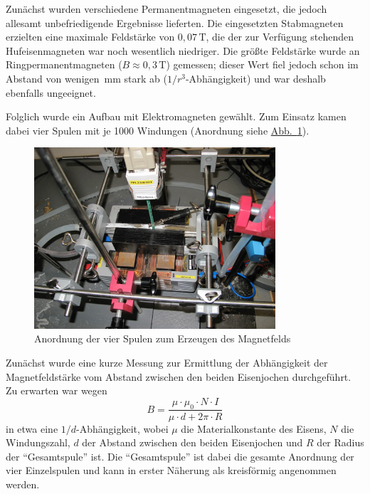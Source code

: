 \documentclass[11pt]{scrartcl}
\newcommand{\unit}[1]{\ensuremath{\,\mathrm{#1}}} %
\newcommand{\abb}[1]{\hyperref[#1]{Abb.~\ref{#1}}}
\begin{document}
Zunächst wurden verschiedene Permanentmagneten eingesetzt, die jedoch allesamt unbefriedigende Ergebnisse lieferten. Die eingesetzten Stabmagneten erzielten eine maximale Feldstärke von $0,07\unit{T}$, die der zur Verfügung stehenden Hufeisenmagneten war noch wesentlich niedriger. Die größte Feldstärke wurde an Ringpermanentmagneten ($B\approx0,3\unit{T}$) gemessen; dieser Wert fiel jedoch schon im Abstand von wenigen $\unit{mm}$ stark ab ($1/r^3$-Abhängigkeit) und war deshalb ebenfalls ungeeignet.

Folglich wurde ein Aufbau mit Elektromagneten gewählt. Zum Einsatz kamen dabei vier Spulen mit je 1000 Windungen (Anordnung siehe \abb{Spulenanordnung}).

\begin{figure}[ht]
\begin{center}
\includegraphics[width=0.8\textwidth]{images/bfeld-vor2.jpg}
\end{center}
\vspace{-1.5\baselineskip}
\caption{Anordnung der vier Spulen zum Erzeugen des Magnetfelds}
\label{Spulenanordnung}
\end{figure}

Zunächst wurde eine kurze Messung zur Ermittlung der Abhängigkeit der Magnetfeldstärke vom Abstand zwischen den beiden Eisenjochen
durchgeführt. Zu erwarten war wegen 
\begin{equation}
B = \frac{\mu \cdot \mu_{0} \cdot N \cdot I}{\mu \cdot d + 2 \pi \cdot R}
\end{equation}
in etwa eine $1/d$-Abhängigkeit, wobei $\mu$ die Materialkonstante des Eisens, $N$ die Windungszahl, $d$ der Abstand zwischen den beiden Eisenjochen und $R$ der Radius der "`Gesamtspule"' ist. Die "`Gesamtspule"' ist dabei die gesamte Anordnung der vier Einzelspulen und kann in erster Näherung als kreisförmig angenommen werden.
\end{document}
